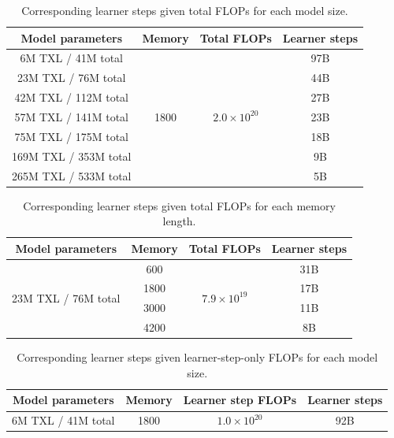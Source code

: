 \documentclass[11pt, a4paper, logo, copyright]{deepmind}
\begin{document}
\begin{appendix}
\begin{table}[t!]
  \begin{center}
    \caption{Corresponding learner steps given total FLOPs for each model size.}
    \begin{tabular}{c|c|c|c}
    \label{tab:parameter_scaling_total_flops}
      Model parameters & Memory & Total FLOPs & Learner steps \\
      \hline
      6M TXL / 41M total & \multirow{7}{*}{1800} & \multirow{7}{*}{$2.0 \times 10^{20}$} & 97B\\
      23M TXL / 76M total & & & 44B\\
      42M TXL / 112M total & & & 27B\\
      57M TXL / 141M total & & & 23B\\
      75M TXL / 175M total & & & 18B\\
      169M TXL / 353M total & & & 9B\\
      265M TXL / 533M total & & & 5B\\
    \end{tabular}
  \end{center}
\end{table}
\begin{table}[t!]
  \begin{center}
    \caption{Corresponding learner steps given total FLOPs for each memory length.}
    \begin{tabular}{c|c|c|c}
    \label{tab:memory_scaling_total_flops}
      Model parameters & Memory & Total FLOPs & Learner steps \\
      \hline
      \multirow{4}{*}{23M TXL / 76M total} & 600 & \multirow{4}{*}{$7.9 \times 10^{19}$} & 31B\\
      & 1800 & & 17B\\
      & 3000 & & 11B\\
      & 4200 & & 8B\\
    \end{tabular}
  \end{center}
\end{table}
\begin{table}[t!]
  \begin{center}
    \caption{Corresponding learner steps given learner-step-only FLOPs for each model size.}
    \begin{tabular}{c|c|c|c}
    \label{tab:parameter_scaling_learner_flops}
      Model parameters & Memory & Learner step FLOPs & Learner steps \\
      \hline
      6M TXL / 41M total & \multirow{7}{*}{1800} & \multirow{7}{*}{$1.0 \times 10^{20}$}& 92B\\

\end{tabular}
\end{center}
\end{table}
\end{appendix}
\end{document}
